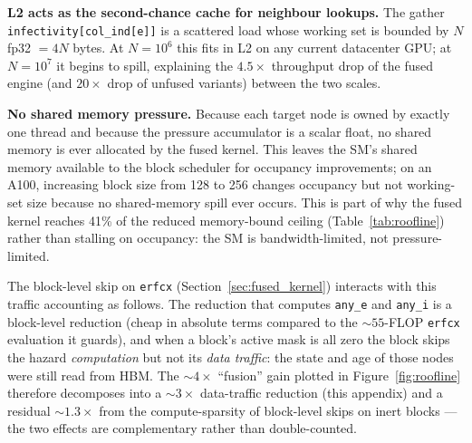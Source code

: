 \textbf{L2 acts as the second-chance cache for neighbour lookups.} The gather \texttt{infectivity[col\_ind[e]]} is a scattered load whose working set is bounded by $N$ fp32 $= 4N$ bytes. At $N = 10^6$ this fits in L2 on any current datacenter GPU; at $N = 10^7$ it begins to spill, explaining the $4.5\times$ throughput drop of the fused engine (and $20\times$ drop of unfused variants) between the two scales.

\textbf{No shared memory pressure.} Because each target node is owned by exactly one thread and because the pressure accumulator is a scalar float, no shared memory is ever allocated by the fused kernel. This leaves the SM's shared memory available to the block scheduler for occupancy improvements; on an A100, increasing block size from 128 to 256 changes occupancy but not working-set size because no shared-memory spill ever occurs. This is part of why the fused kernel reaches 41\% of the reduced memory-bound ceiling (Table~\ref{tab:roofline}) rather than stalling on occupancy: the SM is bandwidth-limited, not pressure-limited.

The block-level skip on \texttt{erfcx} (Section~\ref{sec:fused_kernel}) interacts with this traffic accounting as follows. The reduction that computes \texttt{any\_e} and \texttt{any\_i} is a block-level reduction (cheap in absolute terms compared to the $\sim$$55$-FLOP \texttt{erfcx} evaluation it guards), and when a block's active mask is all zero the block skips the hazard \emph{computation} but not its \emph{data traffic}: the state and age of those nodes were still read from HBM. The $\sim$$4\times$ ``fusion'' gain plotted in Figure~\ref{fig:roofline} therefore decomposes into a $\sim$$3\times$ data-traffic reduction (this appendix) and a residual $\sim$$1.3\times$ from the compute-sparsity of block-level skips on inert blocks --- the two effects are complementary rather than double-counted.
